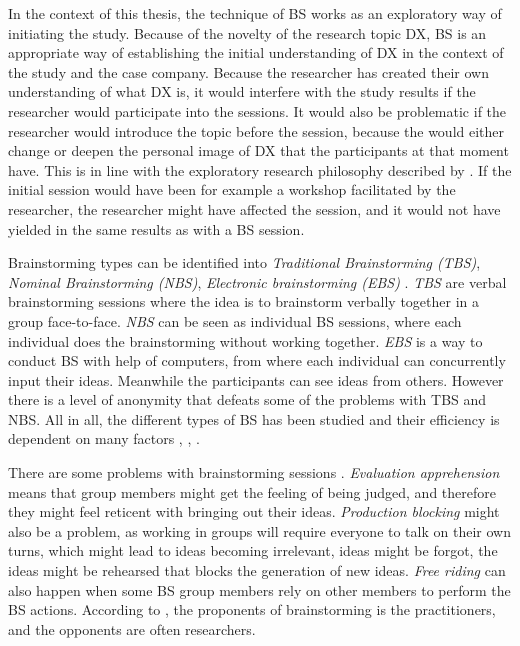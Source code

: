 \documentclass[english, 12pt, a4paper, sci, utf8, a-1b, online]{aaltothesis}
\begin{document}
In the context of this thesis, the technique of BS works as an exploratory way of initiating the study. Because of the novelty of the research topic DX, BS is an appropriate way of establishing the initial understanding of DX in the context of the study and the case company. Because the researcher has created their own understanding of what DX is, it would interfere with the study results if the researcher would participate into the sessions. It would also be problematic if the researcher would introduce the topic before the session, because the would either change or deepen the personal image of DX that the participants at that moment have. This is in line with the exploratory research philosophy described by \cite{ethnographically-informed}. If the initial session would have been for example a workshop facilitated by the researcher, the researcher might have affected the session, and it would not have yielded in the same results as with a BS session.

Brainstorming types can be identified into \textit{Traditional Brainstorming (TBS)}, \textit{Nominal Brainstorming (NBS)}, \textit{Electronic brainstorming (EBS)} \citep{brainstorming-techniques}. \textit{TBS} are verbal brainstorming sessions where the idea is to brainstorm verbally together in a group face-to-face. \textit{NBS} can be seen as individual BS sessions, where each individual does the brainstorming without working together. \textit{EBS} is a way to conduct BS with help of computers, from where each individual can concurrently input their ideas. Meanwhile the participants can see ideas from others. However there is a level of anonymity that defeats some of the problems with TBS and NBS.  All in all, the different types of BS has been studied and their efficiency is dependent on many factors \citep{productivity-loss-in-brainstorming-groups}, \citep{electronic-brainstorming}, \citep{chainstorm}.

There are some problems with brainstorming sessions \citep{electronic-brainstorming} \citep{chainstorm}. \textit{Evaluation apprehension} means that group members might get the feeling of being judged, and therefore they might feel reticent with bringing out their ideas. \textit{Production blocking} might also be a problem, as working in groups will require everyone to talk on their own turns, which might lead to ideas becoming irrelevant, ideas might be forgot, the ideas might be rehearsed that blocks the generation of new ideas. \textit{Free riding} can also happen when some BS group members rely on other members to perform the BS actions. According to \cite{six-issues-of-brainstorming}, the proponents of brainstorming is the practitioners, and the opponents are often researchers.
\end{document}
